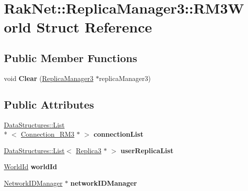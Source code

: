 \hypertarget{struct_rak_net_1_1_replica_manager3_1_1_r_m3_world}{\section{Rak\-Net\-:\-:Replica\-Manager3\-:\-:R\-M3\-World Struct Reference}
\label{struct_rak_net_1_1_replica_manager3_1_1_r_m3_world}
}
\subsection*{Public Member Functions}
\begin{DoxyCompactItemize}
\item 
\hypertarget{struct_rak_net_1_1_replica_manager3_1_1_r_m3_world_af072e6c933d9a566f07e18ea9aac0981}{void {\bfseries Clear} (\hyperlink{class_rak_net_1_1_replica_manager3}{Replica\-Manager3} $\ast$replica\-Manager3)}\label{struct_rak_net_1_1_replica_manager3_1_1_r_m3_world_af072e6c933d9a566f07e18ea9aac0981}

\end{DoxyCompactItemize}
\subsection*{Public Attributes}
\begin{DoxyCompactItemize}
\item 
\hypertarget{struct_rak_net_1_1_replica_manager3_1_1_r_m3_world_acb71878871e34ec35c5d75065f37fe63}{\hyperlink{class_data_structures_1_1_list}{Data\-Structures\-::\-List}\\*
$<$ \hyperlink{class_rak_net_1_1_connection___r_m3}{Connection\-\_\-\-R\-M3} $\ast$ $>$ {\bfseries connection\-List}}\label{struct_rak_net_1_1_replica_manager3_1_1_r_m3_world_acb71878871e34ec35c5d75065f37fe63}

\item 
\hypertarget{struct_rak_net_1_1_replica_manager3_1_1_r_m3_world_a2e2429d4ac85619c5978117d111ca3d9}{\hyperlink{class_data_structures_1_1_list}{Data\-Structures\-::\-List}$<$ \hyperlink{class_rak_net_1_1_replica3}{Replica3} $\ast$ $>$ {\bfseries user\-Replica\-List}}\label{struct_rak_net_1_1_replica_manager3_1_1_r_m3_world_a2e2429d4ac85619c5978117d111ca3d9}

\item 
\hypertarget{struct_rak_net_1_1_replica_manager3_1_1_r_m3_world_a26d2ab0fa7c11fdd34f9d6bf0b7d287d}{\hyperlink{group___r_e_p_l_i_c_a___m_a_n_a_g_e_r___g_r_o_u_p3_ga44b59af8e882248f61aa41d8ace38bf7}{World\-Id} {\bfseries world\-Id}}\label{struct_rak_net_1_1_replica_manager3_1_1_r_m3_world_a26d2ab0fa7c11fdd34f9d6bf0b7d287d}

\item 
\hypertarget{struct_rak_net_1_1_replica_manager3_1_1_r_m3_world_ad94cc2be6ff5199736992a54a1b462f1}{\hyperlink{class_rak_net_1_1_network_i_d_manager}{Network\-I\-D\-Manager} $\ast$ {\bfseries network\-I\-D\-Manager}}\label{struct_rak_net_1_1_replica_manager3_1_1_r_m3_world_ad94cc2be6ff5199736992a54a1b462f1}

\end{DoxyCompactItemize}



